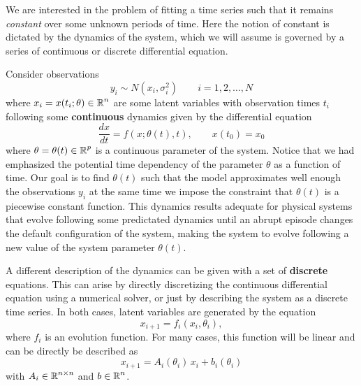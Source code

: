We are interested in the problem of fitting a time series such that it remains \textit{constant} over some unknown periods of time. 
Here the notion of constant is dictated by the dynamics of the system, which we will assume is governed by a series of continuous or discrete differential equation. 

Consider observations
\begin{equation}
    y_i \sim N(x_i, \sigma_i^2) \qquad i=1,2,\ldots, N
\end{equation}
where $x_i = x(t_i; \theta) \in \operatorname{\mathbb{R}}^n$ are some latent variables with observation times $t_i$ following some \textbf{continuous} dynamics given by the differential equation
\begin{equation}
    \frac{dx}{dt}
    = 
    f(x; \theta(t), t),
    \qquad 
    x(t_0) = x_0
    \label{eq:ode}
\end{equation}
where $\theta = \theta(t) \in \operatorname{\mathbb{R}}^p$ is a continuous parameter of the system. 
Notice that we had emphasized the potential time dependency of the parameter $\theta$ as a function of time. 
Our goal is to find $\theta(t)$ such that the model approximates well enough the observations $y_i$ at the same time we impose the constraint that $\theta(t)$ is a piecewise constant function. 
This dynamics results adequate for physical systems that evolve following some predictated dynamics until an abrupt episode changes the default configuration of the system, making the system to evolve following a new value of the system parameter $\theta(t)$. 

A different description of the dynamics can be given with a set of \textbf{discrete} equations. 
This can arise by directly discretizing the continuous differential equation using a numerical solver, or just by describing the system as a discrete time series. 
In both cases, latent variables are generated by the equation 
\begin{equation}
    x_{i+1} = f_i(x_i, \theta_i),
\end{equation}
where $f_i$ is an evolution function. 
For many cases, this function will be linear and can be directly be described as 
\begin{equation}
    x_{i+1} = A_i(\theta_i) \, x_i + b_i(\theta_i)
    \label{eq:ode-discrete}
\end{equation}
with $A_i \in \operatorname{\mathbb{R}}^{n \times n}$ and $b \in \operatorname{\mathbb{R}}^n$.

